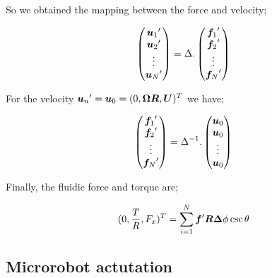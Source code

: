 \documentclass[12pt,a4paper,titlepage]{report}
\begin{document}
So we obtained the mapping between the force and velocity;



\begin{equation}
\begin{pmatrix}
  {\bm{u}_1}\rq{}  \\
  {\bm{u}_2}\rq{} \\
  \vdots  \\
   {\bm{u}_N}\rq{} 
 \end{pmatrix} = \Delta . \begin{pmatrix}
  {\bm{f}_1}\rq{}  \\
  {\bm{f}_2}\rq{} \\
  \vdots  \\
   {\bm{f}_N}\rq{} 
 \end{pmatrix}
\label{mapping}
\end{equation}


For the velocity ${\bm{u}_n}\rq{} = {\bm{u}_0} = (0, \bm{\Omega} \bm{R}, \bm{U})^T$ we have;



\begin{equation}
\begin{pmatrix}
  {\bm{f}_1}\rq{}  \\
  {\bm{f}_2}\rq{} \\
  \vdots  \\
   {\bm{f}_N}\rq{} 
 \end{pmatrix} = {\Delta}^{-1}. \begin{pmatrix}
  {\bm{u}_0}  \\
  {\bm{u}_0} \\
  \vdots  \\
   {\bm{u}_0} 
 \end{pmatrix}
\label{mappingInverse}
\end{equation}


Finally, the fluidic force and torque are;



\begin{equation}
 (0, \frac{T}{R}, F_x)^T = \sum_{i=1}^{N} \bm{f}\rq{} \bm{R} \bm{\Delta}\phi \csc \theta
\label{torqForce}
\end{equation}













\subsection{Microrobot actutation}\label{microActuation}
\end{document}
